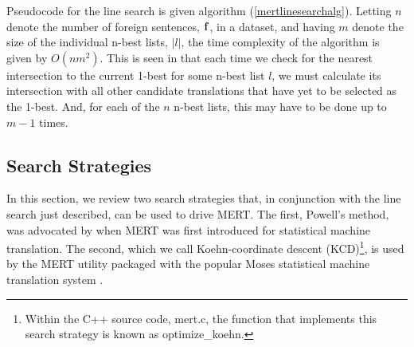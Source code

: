 \documentclass[11pt]{article}
\begin{document}
Pseudocode for the line search is given algorithm (\ref{mertlinesearchalg}). Letting $n$ denote the number of foreign sentences, ${\bf f}$, in a dataset, and having $m$ denote the size of the individual n-best lists, $|l|$, the time complexity of the algorithm is given by $O(n m^2)$. This is seen in that each time we check for the nearest intersection to the current 1-best for some n-best list $l$, we must calculate its intersection with all other candidate translations that have yet to be selected as the 1-best. And, for each of the $n$ n-best lists, this may have to be done up to $m-1$ times. 

    
\subsection{Search Strategies}

In this section, we review two search strategies that, in conjunction with the line search just described, can be used to drive MERT. The first, Powell's method, was advocated by  when MERT was first introduced for statistical machine translation. The second, which we call Koehn-coordinate descent (KCD)\footnote{Within the C++ source code, mert.c, the function that implements this search strategy is known as optimize\_koehn.}, is used by the MERT utility packaged with the popular Moses statistical machine translation system \cite{koehn2007}. 
\end{document}
